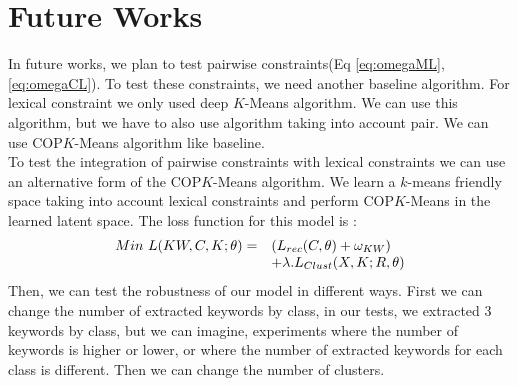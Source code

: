 \section{Future Works}
In future works, we plan to test pairwise constraints(Eq \ref{eq:omegaML}, 
\ref{eq:omegaCL}).
To test these  constraints, we need another baseline algorithm. For
lexical constraint we only used deep $K$-Means algorithm. We can use this
algorithm, but we have to also use algorithm taking into account pair. We can 
use COP$K$-Means algorithm like baseline.\\ 
To test the integration of pairwise constraints with lexical constraints we can 
use an alternative form of the  COP$K$-Means algorithm. We learn a $k$-means 
friendly space taking into account lexical constraints and perform COP$K$-Means
in the learned latent space. The loss function for this model is :
\begin{equation}
\begin{array}{l l}
  Min~L(KW, C, K; \theta) = &(L_{rec}(C, \theta) + \omega_{KW} )
\\ & + \lambda.L_{Clust}(X, K;R, \theta)
\end{array}
\end{equation}
Then, we can test the robustness of our model in different ways.
First we can change the number of extracted keywords by class, in
our tests, we extracted 3 keywords by class, but we can imagine, experiments 
where the number of keywords is higher or lower, or where the number of 
extracted keywords for each class is different. Then we can change the number
of clusters.